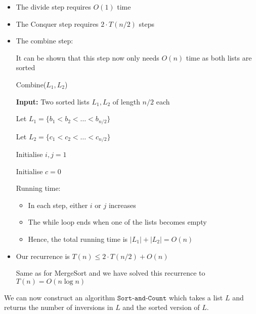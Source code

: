 \documentclass{article}
\begin{document}
\begin{itemize}
  \item The divide step requires $O(1)$ time
  \item The Conquer step requires $2 \cdot T(n/2)$ steps
  \item The combine step:

        It can be shown that this step now only needs $O(n)$  time as both lists are sorted


        \begin{algorithm}
          \caption{Combine($L_{1},L_{2}$)}
          \textbf{Input:} Two sorted lists $L_{1},L_{2}$ of length $n/2$ each

          Let $L_{1} = \{ b_{1} < b_{2} < \ldots < b_{n/2} \} $

          Let $L_{2} = \{ c_{1} < c_{2} < \ldots < c_{n/2} \} $

          Initialise $i,j=1$

          Initialise $c=0$ 


        \end{algorithm}
        Running time:

        \begin{itemize}

          \item In each step, either $i$ or $j$ increases
          \item The while loop ends when one of the lists becomes empty
          \item Hence, the total running time is $|L_{1}| + |L_{2}| = O(n)$

        \end{itemize}
  \item Our recurrence is $T(n) \leq 2 \cdot T(n/2) + O(n)$

        Same as for MergeSort and we have solved this recurrence to $T(n) = O(n\log n)$
\end{itemize}


We can now construct an algorithm $\texttt{Sort-and-Count} $ which takes a list $L$ and returns the number of inversions in $L$ and the sorted version of $L$.
\end{document}
